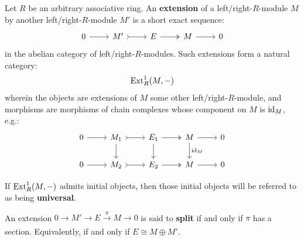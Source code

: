         \begin{definition}
            Let $R$ be an arbitrary associative ring. An \textbf{extension} of a left/right-$R$-module $M$ by another left/right-$R$-module $M'$ is a short exact sequence:
                $$
                    \begin{tikzcd}
                	0 & {M'} & E & M & 0
                	\arrow[from=1-1, to=1-2]
                	\arrow[tail, from=1-2, to=1-3]
                	\arrow[two heads, from=1-3, to=1-4]
                	\arrow[from=1-4, to=1-5]
                    \end{tikzcd}
                $$
            in the abelian category of left/right-$R$-modules. Such extensions form a natural category:
                $$\mathrm{Ext}_R^1(M, -)$$
            wherein the objects are extensions of $M$ some other left/right-$R$-module, and morphisms are morphisms of chain complexes whose component on $M$ is $\mathrm{id}_M$, e.g.:
                $$
                    \begin{tikzcd}
                	0 & {M_1} & {E_1} & M & 0 \\
                	0 & {M_2} & {E_2} & M & 0
                	\arrow[from=1-1, to=1-2]
                	\arrow[tail, from=1-2, to=1-3]
                	\arrow[two heads, from=1-3, to=1-4]
                	\arrow[from=1-4, to=1-5]
                	\arrow[from=2-1, to=2-2]
                	\arrow[tail, from=2-2, to=2-3]
                	\arrow[two heads, from=2-3, to=2-4]
                	\arrow[from=2-4, to=2-5]
                	\arrow["{}", from=1-2, to=2-2]
                	\arrow["{\id_M}", from=1-4, to=2-4]
                	\arrow[from=1-3, to=2-3]
                    \end{tikzcd}
                $$
                
            If $\mathrm{Ext}_R^1(M, -)$ admits initial objects, then those initial objects will be referred to as being \textbf{universal}. 

            An extension $0 \to M' \to E \xrightarrow[]{\pi} M \to 0$ is said to \textbf{split} if and only if $\pi$ has a section. Equivalently, if and only if $E \cong M \oplus M'$. 
        \end{definition}
        
